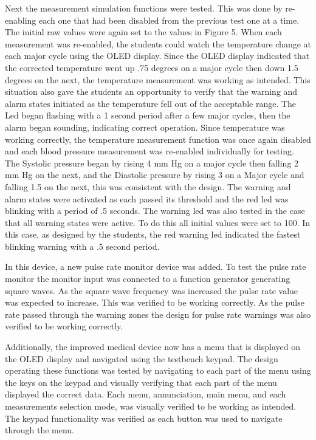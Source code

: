 \documentclass[12pt]{article} %
\begin{document}
    Next the measurement simulation functions were tested. This was done by
    re-enabling each one that had been disabled from the previous test one at a
    time. The initial raw values were again set to the values in Figure 5. When
    each measurement was re-enabled, the students could watch the temperature
    change at each major cycle using the OLED display. Since the OLED display
    indicated that the corrected temperature went up .75 degrees on a major
    cycle then down 1.5 degrees on the next, the temperature measurement was
    working as intended.  This situation also gave the students an opportunity
    to verify that the warning and alarm states initiated as the temperature
    fell out of the acceptable range.  The Led began flashing with a 1 second
    period after a few major cycles, then the alarm began sounding, indicating
    correct operation. Since temperature was working correctly, the temperature
    measurement function was once again disabled and each blood pressure
    measurement was re-enabled individually for testing. The Systolic pressure
    began by rising 4 mm Hg on a major cycle then falling 2 mm Hg on the next,
    and the Diastolic pressure by rising 3 on a Major cycle and falling 1.5 on
    the next, this was consistent with the design. The warning and alarm states
    were activated as each passed its threshold and the red led was blinking
    with a period of .5 seconds.  The warning led was also tested in the case
    that all warning states were active. To do this all initial values were set
    to 100. In this case, as designed by the students, the red warning led
    indicated the fastest blinking warning with a .5 second period. 
    
    In this device, a new pulse rate monitor device was added. To test the
    pulse rate monitor  the monitor input was connected to a function generator
    generating square waves. As the square wave frequency was increased the
    pulse rate value was expected to increase. This was verified to be working
    correctly. As the pulse rate passed through the warning zones the design
    for pulse rate warnings was also verified to be working correctly.
    
    Additionally, the improved medical device now has a menu that is displayed
    on the OLED display and navigated using the testbench keypad. The design
    operating these functions was tested by navigating to each part of the menu
    using the keys on the keypad and visually verifying that each part of the
    menu displayed the correct data. Each menu, annunciation, main menu, and
    each measurements selection mode, was visually verified to be working as
    intended. The keypad functionality was verified as each button was used to
    navigate through the menu.
    
\end{document}

